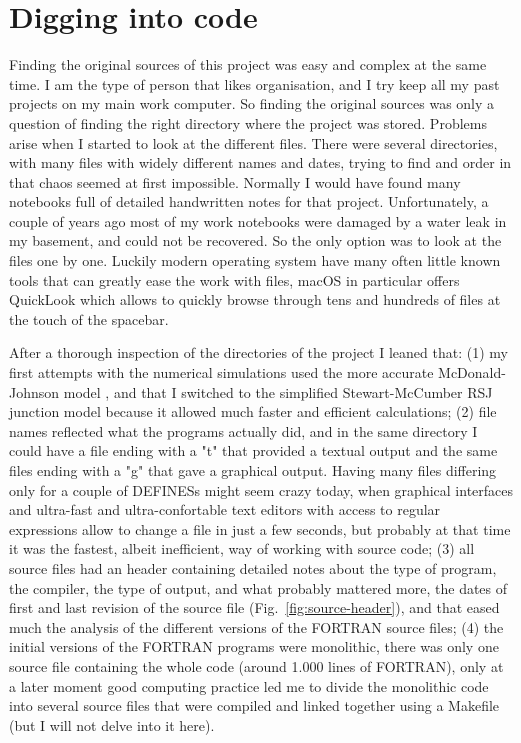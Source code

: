 \section{Digging into code}

Finding the original sources of this project was easy and complex at the same time. I am the type of person that likes organisation, and I try keep all my past projects on my main work computer. So finding the original sources was only a question of finding the right directory where the project was stored.
Problems arise when I started to look at the different files. There were several directories, with many files with widely different names and dates, trying to find and order in that chaos seemed at first impossible. Normally I would have found many notebooks full of detailed handwritten notes for that project. Unfortunately, a couple of years ago most of my work notebooks were damaged by a water leak in my basement, and could not be recovered. So the only option was to look at the files one by one. Luckily modern operating system have many often little known tools that can greatly ease the work with files, macOS in particular offers QuickLook which allows to quickly browse through tens and hundreds of files at the touch of the spacebar.


After a thorough inspection of the directories of the project I leaned that: (1) my first attempts with the numerical simulations used the more accurate McDonald-Johnson model \cite{McDonald:1976}, and that I switched to the simplified Stewart-McCumber RSJ junction model \cite{McCumber:1968, Stewart:1974} because it allowed much faster and efficient calculations; (2) file names reflected what the programs actually did, and in the same directory I could have a file ending with a "t" that provided a textual output and the same files ending with a "g" that gave a graphical output. Having many files differing only for a couple of \textsf{DEFINES}s might seem crazy today, when graphical interfaces and ultra-fast and ultra-confortable text editors with access to regular expressions allow to change a file in just a few seconds, but probably at that time it was the fastest, albeit inefficient, way of working with source code; (3) all source files had an header containing detailed notes about the type of program, the compiler, the type of output, and what probably mattered more, the dates of first and last revision of the source file (Fig.~\ref{fig:source-header}), and that eased much the analysis of the different versions of the FORTRAN source files; (4) the initial versions of the FORTRAN programs were monolithic, there was only one source file containing the whole code (around 1.000 lines of FORTRAN), only at a later moment good computing practice led me to divide the monolithic code into several source files that were compiled and linked together using a \textsf{Makefile} (but I will not delve into it here).

